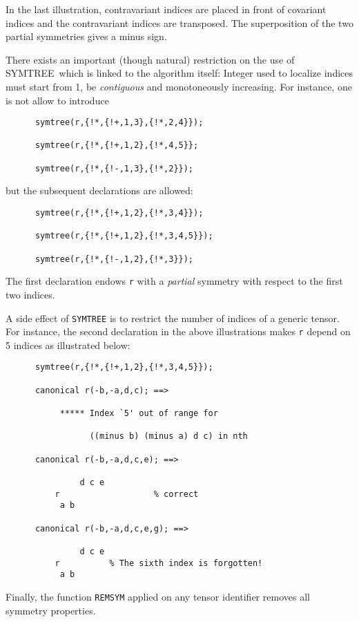 In the last illustration, contravariant indices are placed in front 
of covariant indices and the contravariant indices are transposed. 
The superposition of the two partial symmetries gives a minus sign.

There exists an important (though natural) restriction on the use of 
SYMTREE\ which is linked to the algorithm itself: Integer used to localize
indices must start from 1, be \emph{contiguous} and monotoneously increasing. 
For instance, one is not allow to introduce
\begin{verbatim}
      symtree(r,{!*,{!+,1,3},{!*,2,4}});

      symtree(r,{!*,{!+,1,2},{!*,4,5}};

      symtree(r,{!*,{!-,1,3},{!*,2}});
\end{verbatim}
but the subsequent declarations are allowed:
\begin{verbatim}
      symtree(r,{!*,{!+,1,2},{!*,3,4}});

      symtree(r,{!*,{!+,1,2},{!*,3,4,5}});

      symtree(r,{!*,{!-,1,2},{!*,3}});
\end{verbatim}
The first declaration endows \texttt{r} with a \emph{partial} symmetry 
with respect to the first two indices. 

A side effect of \texttt{SYMTREE} is to restrict the number of indices of 
a generic tensor. For instance, the second declaration in the above 
illustrations makes \texttt{r} depend on 5 indices as illustrated below:
\begin{verbatim}
      symtree(r,{!*,{!+,1,2},{!*,3,4,5}});

      canonical r(-b,-a,d,c); ==> 

           ***** Index `5' out of range for 

                 ((minus b) (minus a) d c) in nth

      canonical r(-b,-a,d,c,e); ==>

               d c e
          r                   % correct
           a b

      canonical r(-b,-a,d,c,e,g); ==>

               d c e
          r          % The sixth index is forgotten!
           a b
\end{verbatim}
Finally, the function \texttt{REMSYM} applied on any tensor
identifier removes all symmetry properties.

